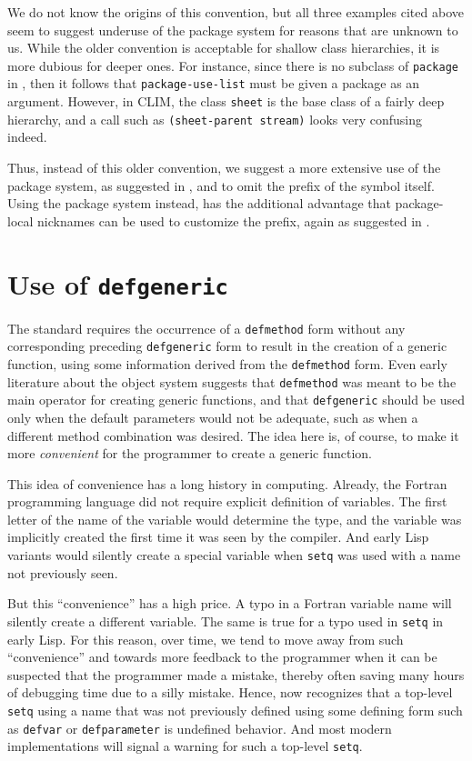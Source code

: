 We do not know the origins of this convention, but all three examples
cited above seem to suggest underuse of the package system for reasons
that are unknown to us.  While the older convention is acceptable for
shallow class hierarchies, it is more dubious for deeper ones.  For
instance, since there is no subclass of \texttt{package} in
\commonlisp{}, then it follows that \texttt{package-use-list} must be
given a package as an argument.  However, in CLIM, the class
\texttt{sheet} is the base class of a fairly deep hierarchy, and
a call such as \texttt{(sheet-parent stream)} looks very confusing
indeed.

Thus, instead of this older convention, we suggest a more extensive
use of the package system, as suggested in
, and to omit the prefix of
the symbol itself.  Using the package system instead, has the
additional advantage that package-local nicknames can be used to
customize the prefix, again as suggested in
.

\section{Use of \texttt{defgeneric}}

The \commonlisp{} standard requires the occurrence of a
\texttt{defmethod} form without any corresponding preceding
\texttt{defgeneric} form to result in the creation of a generic
function, using some information derived from the \texttt{defmethod}
form.  Even early literature about the \commonlisp{} object system
\cite{Paeke:1993:OOP} suggests that \texttt{defmethod} was meant to be
the main operator for creating generic functions, and that
\texttt{defgeneric} should be used only when the default parameters
would not be adequate, such as when a different method combination was
desired.  The idea here is, of course, to make it more
\emph{convenient} for the programmer to create a generic function.

This idea of convenience has a long history in computing.  Already,
the Fortran programming language did not require explicit definition
of variables.  The first letter of the name of the variable would
determine the type, and the variable was implicitly created the first
time it was seen by the compiler.  And early Lisp variants would
silently create a special variable when \texttt{setq} was used with a
name not previously seen.

But this ``convenience'' has a high price.  A typo in a Fortran
variable name will silently create a different variable.  The same is
true for a typo used in \texttt{setq} in early Lisp.  For this reason,
over time, we tend to move away from such ``convenience'' and towards
more feedback to the programmer when it can be suspected that the
programmer made a mistake, thereby often saving many hours of
debugging time due to a silly mistake.  Hence, \commonlisp{} now
recognizes that a top-level \texttt{setq} using a name that was not
previously defined using some defining form such as \texttt{defvar} or
\texttt{defparameter} is undefined behavior.  And most modern
\commonlisp{} implementations will signal a warning for such a
top-level \texttt{setq}.

